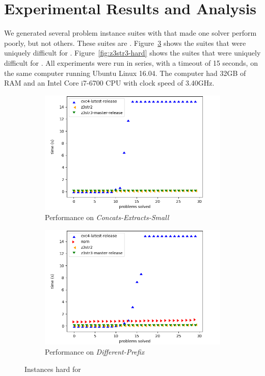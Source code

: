 \section{Experimental Results and Analysis}
\label{sec:data}

We generated several problem instance suites with \fuzzer{} that made one
solver perform poorly, but not others. These suites are
\theSuites{}. Figure~\ref{fig:cvc-hard} shows the suites that were
uniquely difficult for \cvc{}. Figure~\ref{fig:z3str3-hard} shows the
suites that were uniquely difficult for \us{}. All experiments were
run in series, with a timeout of 15 seconds, on the same computer running
Ubuntu Linux 16.04. The computer had 32GB of RAM and an
Intel\textregistered{} Core\texttrademark{} i7-6700 CPU with clock speed
of 3.40GHz.

\begin{figure}[h]
    \begin{subfigure}{.5\textwidth}
        \includegraphics[width=\textwidth]{data/graphs/concats-extracts-small.png}
        \caption{Performance on \textit{Concats-Extracts-Small}}
        \label{fig:concats-extracts-small}
    \end{subfigure}
    \begin{subfigure}{.5\textwidth}
        \includegraphics[width=\textwidth]{data/graphs/different-prefix.png}
        \caption{Performance on \textit{Different-Prefix}}
        \label{fig:different-prefix}
    \end{subfigure}
    \caption{Instances hard for \cvc{}}
    \label{fig:cvc-hard}


\end{figure}
